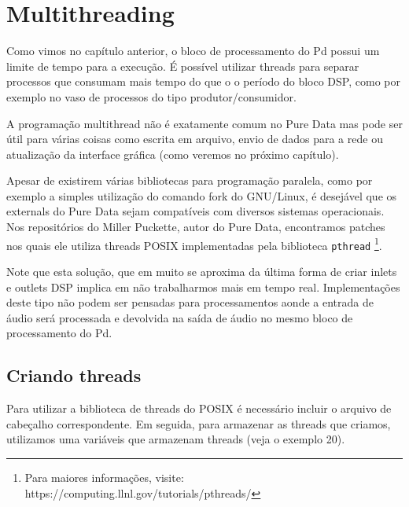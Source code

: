 
\chapter{Multithreading}


Como vimos no capítulo anterior, o bloco de processamento do Pd possui um
limite de tempo para a execução. É possível utilizar threads para separar
processos que consumam mais tempo do que o o período do bloco DSP, como por
exemplo no vaso de processos do tipo produtor/consumidor.

A programação multithread não é exatamente comum no Pure Data mas pode ser
útil para várias coisas como escrita em arquivo, envio de dados para a rede ou
atualização da interface gráfica (como veremos no próximo capítulo).

Apesar de existirem várias bibliotecas para programação paralela, como por
exemplo a simples utilização do comando fork do GNU/Linux, é desejável que os
externals do Pure Data sejam compatíveis com diversos sistemas operacionais.
Nos repositórios do Miller Puckette, autor do Pure Data, encontramos patches
nos quais ele utiliza threads POSIX implementadas pela biblioteca
\texttt{pthread} \footnote{Para maiores informações, visite:
https://computing.llnl.gov/tutorials/pthreads/}.

Note que esta solução, que em muito se aproxima da última forma de criar
inlets e outlets DSP implica em não trabalharmos mais em tempo real.
Implementações deste tipo não podem ser pensadas para processamentos aonde a
entrada de áudio será processada e devolvida na saída de áudio no mesmo bloco
de processamento do Pd.

\section{Criando threads}

Para utilizar a biblioteca de threads do POSIX é necessário incluir o arquivo
de cabeçalho correspondente. Em seguida, para armazenar as threads que
criamos, utilizamos uma variáveis que armazenam threads (veja o exemplo 20).

